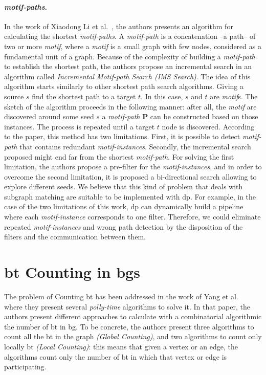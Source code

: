 \paragraph{\emph{motif-paths}.} In the work of Xiaodong Li et al.~\cite{Li2019MotifPA}, the authors presents an algorithm for calculating the shortest \emph{motif-paths}.
A \emph{motif-path} is a concatenation --a path--  of two or more \emph{motif}, where a \emph{motif} is a small graph with few nodes, considered as a fundamental unit of a graph.
Because of the complexity of building a \emph{motif-path} to establish the shortest path, the authors propose an incremental search in an algorithm called \emph{Incremental Motif-path Search (IMS Search)}.
The idea of this algorithm starts similarly to other shortest path search algorithms. Giving a source $s$ find the shortest path to a target $t$. In this case, $s$ and $t$ are \emph{motif}s.
The sketch of the algorithm proceeds in the following manner: after all, the \emph{motif} are discovered around some seed $s$ a \emph{motif-path} $\mathbf{P}$ can be constructed based on those instances.
The process is repeated until a target $t$ node is discovered. According to the paper, this method has two limitations. First, it is possible to detect \emph{motif-path} that contains 
redundant \emph{motif-instances}. Secondly, the incremental search proposed might end far from the shortest \emph{motif-path}. For solving the first limitation, the authors propose a pre-filter for the \emph{motif-instances},
and in order to overcome the second limitation, it is proposed a bi-directional search allowing to explore different seeds. 
We believe that this kind of problem that deals with subgraph matching are suitable to be implemented with \acrlong{dp}. 
For example, in the case of the two limitations of this work, \acrshort{dp} can dynamically build a pipeline where each \emph{motif-instance} corresponds to one filter. 
Therefore, we could eliminate repeated \emph{motif-instances} and wrong path detection by the disposition of the filters and the communication between them.

\section{\acrlong{bt} Counting in \acrlong{bg}s}\label{sec:rel-work:counting}
The problem of Counting \acrshort{bt} has been addressed in the work of Yang et al.~\cite{btcount} where they present several \emph{polly-time} algorithms to solve it.
In that paper, the authors present different approaches to calculate with a combinatorial algorithmic the number of \acrshort{bt} in \acrshort{bg}. 
To be concrete, the authors present three algorithms to count all the \acrshort{bt} in the graph \emph{(Global Counting)}, and two algorithms to count only locally \acrshort{bt} \emph{(Local Counting)}: this means that given a vertex or an edge, the algorithms count only the number of \acrshort{bt} in which 
that vertex or edge is participating.

